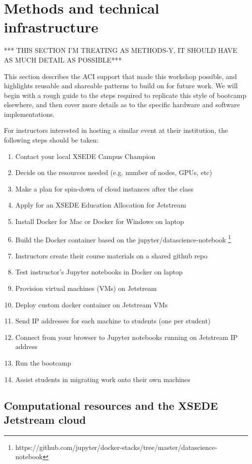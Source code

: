 \section{Methods and technical infrastructure}\label{sec:methods}

*** THIS SECTION I'M TREATING AS METHODS-Y, IT SHOULD HAVE AS MUCH DETAIL AS POSSIBLE***

This section describes the ACI support that made this workshop possible, and
highlights reusable and shareable patterns to build on for future work. We will
begin with a rough guide to the steps required to replicate this style of
bootcamp elsewhere, and then cover more details as to the specific hardware and
software implementations.

For instructors interested in hosting a similar event at their institution, the
following steps should be taken:

\begin{enumerate}
\item Contact your local XSEDE Campus Champion
\item Decide on the resources needed (e.g. number of nodes, GPUs, etc)
\item Make a plan for spin-down of cloud instances after the class
\item Apply for an XSEDE Education Allocation for Jetstream
\item Install Docker for Mac or Docker for Windows on laptop
\item Build the Docker container based on the jupyter/datascience-notebook \footnote{https://github.com/jupyter/docker-stacks/tree/master/datascience-notebook}
\item Instructors create their course materials on a shared github repo
\item Test instructor's Jupyter notebooks in Docker on laptop
\item Provision virtual machines (VMs) on Jetstream
\item Deploy custom docker container on Jetstream VMs
\item Send IP addresses for each machine to students (one per student)
\item Connect from your browser to Jupyter notebooks running on Jetstream IP address
\item Run the bootcamp
\item Assist students in migrating work onto their own machines
\end{enumerate}

\subsection{Computational resources and the XSEDE Jetstream cloud}

